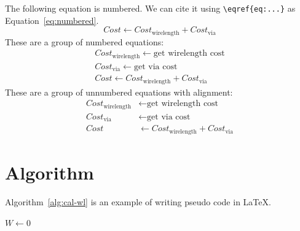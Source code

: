 The following equation is numbered. We can cite it using \verb|\eqref{eq:...}| as Equation~\eqref{eq:numbered}.
\begin{equation}
    Cost \gets Cost_{\mathrm{wirelength}} + Cost_{\mathrm{via}} \label{eq:numbered}
\end{equation}
These are a group of numbered equations:
\begin{gather}
    Cost_{\mathrm{wirelength}} \gets \text{get wirelength cost} \\
    Cost_{\mathrm{via}} \gets \text{get via cost} \\
    Cost \gets Cost_{\mathrm{wirelength}} + Cost_{\mathrm{via}}
\end{gather}
These are a group of unnumbered equations with alignment:
\begin{align*}
    Cost_{\mathrm{wirelength}} &\gets \text{get wirelength cost} \\
    Cost_{\mathrm{via}} &\gets \text{get via cost} \\
    Cost &\gets Cost_{\mathrm{wirelength}} + Cost_{\mathrm{via}}
\end{align*}

\section{Algorithm}
Algorithm~\ref{alg:cal-wl} is an example of writing pseudo code in LaTeX.

\begin{algorithm}
    \caption{\texttt{CalWL}: Calculate the total wirelength}
    \label{alg:cal-wl}
    \SetAlgoLined
    \SetNoFillComment



    $W \gets 0$\;

    \BlankLine

    \;
\end{algorithm}

